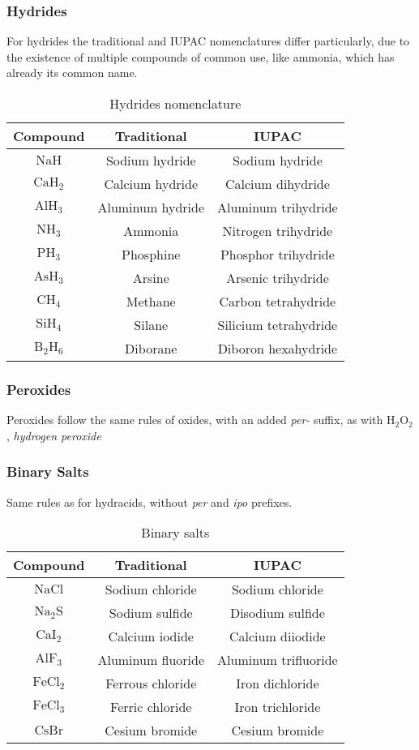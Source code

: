 \documentclass[../qm.tex]{subfiles}
\begin{document}
\subsubsection{Hydrides}
For hydrides the traditional and IUPAC nomenclatures differ particularly, due to the existence of multiple compounds of common use, like ammonia, which has already its common name.
\begin{table}[H]
	\centering
	\begin{tabular}{c|c|c}
		Compound&Traditional&IUPAC\\\hline
		$\mathrm{NaH}$&Sodium hydride&Sodium hydride\\\hline
		$\mathrm{CaH_2}$&Calcium hydride&Calcium dihydride\\\hline
		$\mathrm{AlH_3}$&Aluminum hydride&Aluminum trihydride\\\hline
		$\mathrm{NH_3}$&Ammonia&Nitrogen trihydride\\\hline
		$\mathrm{PH_3}$&Phosphine&Phosphor trihydride\\\hline
		$\mathrm{AsH_3}$&Arsine&Arsenic trihydride\\\hline
		$\mathrm{CH_4}$&Methane&Carbon tetrahydride\\\hline
		$\mathrm{SiH_4}$&Silane&Silicium tetrahydride\\\hline
		$\mathrm{B_2H_6}$&Diborane&Diboron hexahydride\\\hline
	\end{tabular}
	\caption{Hydrides nomenclature}
	\label{tab:hydrides.chem}
\end{table}
\subsubsection{Peroxides}
Peroxides follow the same rules of oxides, with an added \textit{per-} suffix, as with $\mathrm{H_2O_2}$, \textit{hydrogen peroxide}
\subsubsection{Binary Salts}
Same rules as for hydracids, without \textit{per} and \textit{ipo} prefixes. 
\begin{table}[H]
	\centering
	\begin{tabular}{c|c|c}
		Compound&Traditional&IUPAC\\\hline
		$\mathrm{NaCl}$&Sodium chloride&Sodium chloride\\\hline
		$\mathrm{Na_2S}$&Sodium sulfide&Disodium sulfide\\\hline
		$\mathrm{CaI_2}$&Calcium iodide&Calcium diiodide\\\hline
		$\mathrm{AlF_3}$&Aluminum fluoride&Aluminum trifluoride\\\hline
		$\mathrm{FeCl_2}$&Ferrous chloride&Iron dichloride\\\hline
		$\mathrm{FeCl_3}$&Ferric chloride&Iron trichloride\\\hline
		$\mathrm{CsBr}$&Cesium bromide&Cesium bromide\\\hline
	\end{tabular}
	\caption{Binary salts}
	\label{tab:binary.chem}
\end{table}
\end{document}
